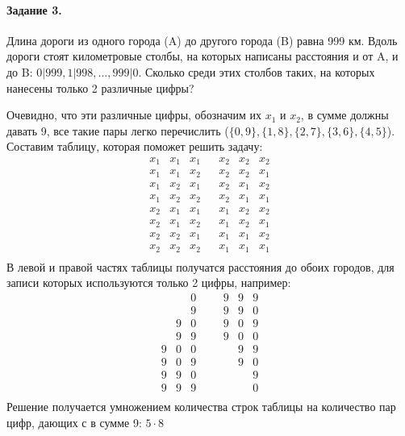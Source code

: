 \documentclass[a4paper,12pt]{article}
\begin{document}
\paragraph{Задание 3.} Длина дороги из одного города (A) до другого города (B) равна 999 км. Вдоль дороги стоят километровые столбы, на которых написаны расстояния и от A, и до B: $0|999, 1|998, ... , 999|0$. Сколько среди этих столбов таких, на которых нанесены только 2 различные цифры?
\begin{Solution}
Очевидно, что эти различные цифры, обозначим их $x_1$ и $x_2$, в сумме должны давать 9, все такие пары легко перечислить ($\{0, 9\}, \{1, 8\}, \{2, 7\}, \{3, 6\}, \{4, 5\}$). Составим таблицу, которая поможет решить задачу:
\[
	\begin{matrix}
		x_1 & x_1 & x_1 && x_2 & x_2 & x_2 \\
		x_1 & x_1 & x_2 && x_2 & x_2 & x_1 \\
		x_1 & x_2 & x_1 && x_2 & x_1 & x_2 \\
		x_1 & x_2 & x_2 && x_2 & x_1 & x_1 \\
		x_2 & x_1 & x_1 && x_1 & x_2 & x_2 \\
		x_2 & x_1 & x_2 && x_1 & x_2 & x_1 \\
		x_2 & x_2 & x_1 && x_1 & x_1 & x_2 \\
		x_2 & x_2 & x_2 && x_1 & x_1 & x_1 \\
	\end{matrix}
\]
В левой и правой частях таблицы получатся расстояния до обоих городов, для записи которых используются только 2 цифры, например:
\[
	\begin{matrix}
		  &   & 0 & && 9 & 9 & 9 \\
		  &   & 9 & && 9 & 9 & 0 \\
		  & 9 & 0 & && 9 & 0 & 9 \\
		  & 9 & 9 & && 9 & 0 & 0 \\
		9 & 0 & 0 & &&   & 9 & 9 \\
		9 & 0 & 9 & &&   & 9 & 0 \\
		9 & 9 & 0 & &&   &   & 9 \\
		9 & 9 & 9 & &&   &   & 0 \\
	\end{matrix}
\]
Решение получается умножением количества строк таблицы на количество пар цифр, дающих с в сумме 9: $5 \cdot 8$
\end{Solution}
\end{document}
